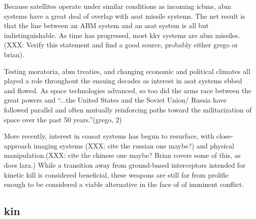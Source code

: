 Because satellites operate under similar conditions as incoming
\acp{icbm}, \ac{abm} systems have a great deal of overlap with
\ac{asat} missile systems.  The net result is that the line between an
ABM system and an \ac{asat} system is all but indistinguishable.  As
time has progressed, most \ac{kkv} systems are \ac{abm} missiles.(XXX:
Verify this statement and find a good source, probably either grego or
brian).

Testing moratoria, \ac{abm} treaties, and changing economic and
political climates all played a role throughout the ensuing decades as
interest in \ac{asat} systems ebbed and
flowed.\cite[XXX]{grego} As space technologies advanced, so too
did the arms race between the great powers and ``...the United States
and the Soviet Union/ Russia have followed parallel and often mutually
reinforcing paths toward the militarization of space over the past 50
years.''(grego, 2)

More recently, interest in \ac{coasat} systems has begun to resurface,
with close-approach imaging systems (XXX: cite the russian one maybe?)
and physical manipulation.(XXX: cite the chinese one maybe?  Brian
covers some of this, as does lara.)  While a transition away from
ground-based interceptors intended for kinetic kill is considered
beneficial, these weapons are still far from prolific enough to be
considered a viable alternative in the face of of imminent conflict.

\subsection{\acf{kin}}

